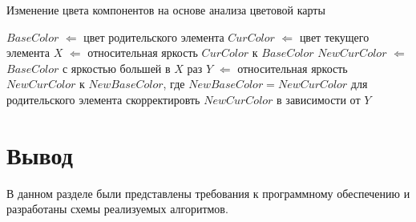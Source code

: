 \begin{algorithm}[H]
	\caption{Изменение цвета компонентов на основе анализа цветовой карты}
	\label{alg:analchange}
	\begin{algorithmic}[1]
		\State $BaseColor$ $\Leftarrow$ цвет родительского элемента
		\State $CurColor$ $\Leftarrow$ цвет текущего элемента
		\State $X$ $\Leftarrow$ относительная яркость $CurColor$ к $BaseColor$
		\State $NewCurColor$ $\Leftarrow$ $BaseColor$ с яркостью большей в $X$ раз
		\State $Y$ $\Leftarrow$ относительная яркость $NewCurColor$ к $NewBaseColor$, где $NewBaseColor = NewCurColor$ для родительского элемента
		\State скорректировть $NewCurColor$ в зависимости от $Y$
		\EndIf
		\EndFor
	\end{algorithmic}
\end{algorithm}


\section*{Вывод}

В данном разделе были представлены требования к программному обеспечению и разработаны схемы реализуемых алгоритмов.